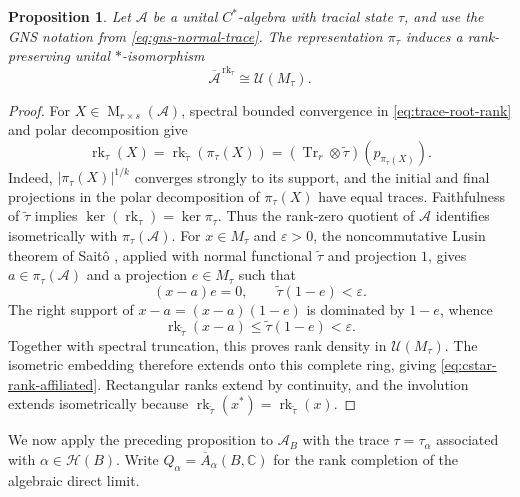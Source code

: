 \documentclass[11pt]{amsart}
\DeclareMathOperator{\rk}{rk}
\DeclareMathOperator{\Mat}{M}
\newtheorem{proposition}[theorem]{Proposition}
\theoremstyle{definition}
\theoremstyle{remark}
\begin{document}
\begin{proposition}
\label{prop:cstar-rank-affiliated}
Let $\mathcal A$ be a unital $C^*$-algebra with tracial state $\tau$,
and use the GNS notation from \eqref{eq:gns-normal-trace}.
The representation $\pi_\tau$ induces a rank-preserving unital
$*$-isomorphism
\begin{equation}\label{eq:cstar-rank-affiliated}
 \overline{\mathcal A}^{\,\rk_\tau}\cong\mathcal U(M_\tau).
\end{equation}
\end{proposition}

\begin{proof}
For $X\in\Mat_{r\times s}(\mathcal A)$, spectral bounded convergence
in \eqref{eq:trace-root-rank} and polar decomposition give
\begin{equation}\label{eq:trace-support-rank}
 \rk_\tau(X)=\rk_{\widetilde\tau}(\pi_\tau(X))
 =(\operatorname{Tr}_r\otimes\widetilde\tau)(p_{\pi_\tau(X)}).
\end{equation}
Indeed, $|\pi_\tau(X)|^{1/k}$ converges strongly to its support,
and the initial and final projections in the polar decomposition of
$\pi_\tau(X)$ have equal traces.
Faithfulness of $\widetilde\tau$ implies
$\ker(\rk_\tau)=\ker\pi_\tau$.
Thus the rank-zero quotient of $\mathcal A$ identifies isometrically
with $\pi_\tau(\mathcal A)$.
For $x\in M_\tau$ and $\varepsilon>0$, the noncommutative Lusin
theorem of Sait\^o \cite[Theorem~2]{Saito1967}, applied with normal functional
$\widetilde\tau$ and projection $1$, gives $a\in\pi_\tau(\mathcal A)$
and a projection $e\in M_\tau$ such that
\[
 (x-a)e=0,\qquad \widetilde\tau(1-e)<\varepsilon.
\]
The right support of $x-a=(x-a)(1-e)$ is dominated by $1-e$, whence
\begin{equation}\label{eq:lusin-rank-estimate}
 \rk_{\widetilde\tau}(x-a)\leq\widetilde\tau(1-e)<\varepsilon.
\end{equation}
Together with spectral truncation, this proves rank density in
$\mathcal U(M_\tau)$.  The isometric embedding therefore extends onto
this complete ring, giving \eqref{eq:cstar-rank-affiliated}.
Rectangular ranks extend by continuity, and the involution extends
isometrically because $\rk_{\widetilde\tau}(x^*)=\rk_{\widetilde\tau}(x)$.
\end{proof}

We now apply the preceding proposition to $\mathcal A_B$ with
the trace $\tau=\tau_\alpha$ associated with $\alpha\in\mathcal H(B)$.
Write $Q_\alpha=\overline A_\alpha(B,\mathbb C)$ for the rank
completion of the algebraic direct limit.
\end{document}
